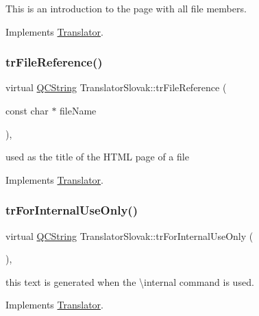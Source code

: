 This is an introduction to the page with all file members. 

Implements \mbox{\hyperlink{class_translator}{Translator}}.

\mbox{\label{class_translator_slovak_a268444286f7cd4b7827544403bf4b17b}} 
\subsubsection{\texorpdfstring{trFileReference()}{trFileReference()}}
{\footnotesize\ttfamily virtual \mbox{\hyperlink{class_q_c_string}{Q\+C\+String}} Translator\+Slovak\+::tr\+File\+Reference (\begin{DoxyParamCaption}\item[{const char $\ast$}]{file\+Name }\end{DoxyParamCaption})\hspace{0.3cm}{\ttfamily [inline]}, {\ttfamily [virtual]}}

used as the title of the H\+T\+ML page of a file 

Implements \mbox{\hyperlink{class_translator}{Translator}}.

\mbox{\label{class_translator_slovak_a03b7cf97e99251e43dd1e42a452732ef}} 
\subsubsection{\texorpdfstring{trForInternalUseOnly()}{trForInternalUseOnly()}}
{\footnotesize\ttfamily virtual \mbox{\hyperlink{class_q_c_string}{Q\+C\+String}} Translator\+Slovak\+::tr\+For\+Internal\+Use\+Only (\begin{DoxyParamCaption}{ }\end{DoxyParamCaption})\hspace{0.3cm}{\ttfamily [inline]}, {\ttfamily [virtual]}}

this text is generated when the \textbackslash{}internal command is used. 

Implements \mbox{\hyperlink{class_translator}{Translator}}.

\mbox{\label{class_translator_slovak_a5e714e27edfb98b787406c5dbdaf56d2}} 
